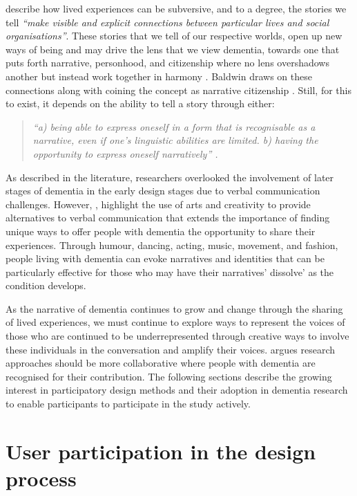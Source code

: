 \cite{ewick_subversive_1995} describe how lived experiences can be subversive, and to a degree, the stories we tell \textit{``make visible and explicit connections between particular lives and social organisations''}. These stories that we tell of our respective worlds, open up new ways of being and may drive the lens that we view dementia, towards one that puts forth narrative, personhood, and citizenship where no lens overshadows another but instead work together in harmony \citep{dupuis_re-claiming_2016}. Baldwin draws on these connections along with coining the concept as narrative citizenship \citep{baldwin_narrative_2008}. Still, for this to exist, it depends on the ability to tell a story through either:
\begin{quote}
\textit{ ``a) being able to express oneself in a form that is recognisable as a narrative, even if one's linguistic abilities are limited. 
b) having the opportunity to express oneself narratively'' \citep{baldwin_narrative_2008}.  }
\end{quote}

As described in the literature, researchers overlooked the involvement of later stages of dementia in the early design stages due to verbal communication challenges. However, \citep{john_killick_claire_craig_creativity_2012}, highlight the use of arts and creativity to provide alternatives to verbal communication that extends the importance of finding unique ways to offer people with dementia the opportunity to share their experiences. Through humour, dancing, acting, music, movement, and fashion, people living with dementia can evoke narratives and identities that can be particularly effective for those who may have their narratives' dissolve' as the condition develops.

As the narrative of dementia continues to grow and change through the sharing of lived experiences, we must continue to explore ways to represent the voices of those who are continued to be underrepresented through creative ways to involve these individuals in the conversation and amplify their voices. \cite{swarbrick2015quest} argues research approaches should be more collaborative where people with dementia are recognised for their contribution. The following sections describe the growing interest in participatory design methods and their adoption in dementia research to enable participants to participate in the study actively. 


\section{User participation in the design process}
\label{ParticipationDesignProcess}

